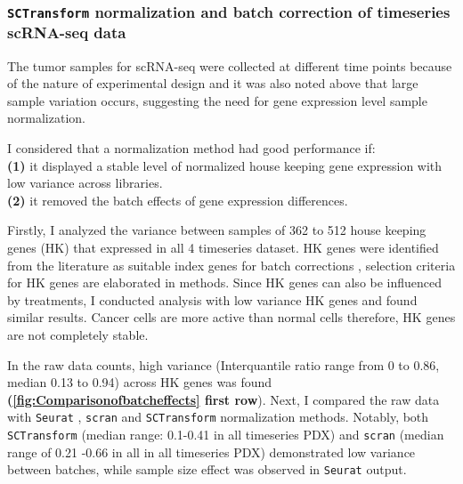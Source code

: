 \subsubsection{\texttt{SCTransform} normalization and batch correction of timeseries scRNA-seq data}
The tumor samples for scRNA-seq were collected at different time points because of the nature of experimental design and it was also noted above that large sample variation occurs, suggesting the need for gene expression level sample normalization. 

I considered that a normalization method had good performance if:
\\
\textbf{(1)} it displayed a stable level of normalized house keeping gene expression with low variance across libraries.
\\
\textbf{(2)} it removed the batch effects of gene expression differences. 

Firstly, I analyzed the variance between samples of 362 to 512 house keeping genes (HK) that expressed in all 4 timeseries dataset. HK genes were identified from the literature as suitable index genes for batch corrections \cite{lin2019evaluating}, selection criteria for HK genes are elaborated in methods.
Since HK genes can also be influenced by treatments,
I conducted analysis with low variance HK genes and found similar results.
Cancer cells are more active than normal cells therefore, HK genes are not completely stable.

In the raw data counts, high variance (Interquantile ratio range from 0 to 0.86, median 0.13 to 0.94) across HK genes was found \textbf{(\autoref{fig:Comparisonofbatcheffects} first row}).
Next, I compared the raw data with \texttt{Seurat} \cite{butler2018integrating}, \texttt{scran} \cite{lun2016pooling} and \texttt{SCTransform} \cite{hafemeister2019normalization} normalization methods. 
Notably, both \texttt{SCTransform} (median range: 0.1-0.41 in all timeseries PDX) and \texttt{scran} (median range of 0.21 -0.66 in all in all timeseries PDX) demonstrated low variance between batches, while sample size effect was observed in \texttt{Seurat} output.

